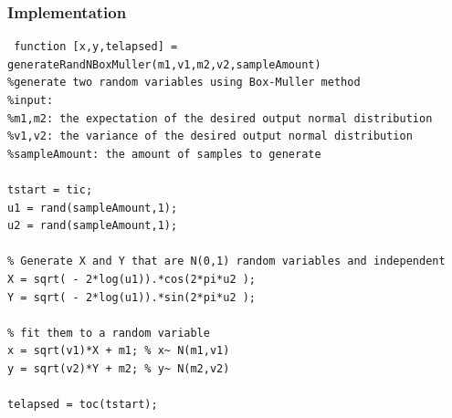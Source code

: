 \documentclass[twoside]{article}
\begin{document}
\begin{multicols*}{2}
\subsubsection{Implementation}
 \begin{lstlisting}
 function [x,y,telapsed] = generateRandNBoxMuller(m1,v1,m2,v2,sampleAmount)
%generate two random variables using Box-Muller method
%input: 
%m1,m2: the expectation of the desired output normal distribution
%v1,v2: the variance of the desired output normal distribution
%sampleAmount: the amount of samples to generate 

tstart = tic;
u1 = rand(sampleAmount,1);
u2 = rand(sampleAmount,1);

% Generate X and Y that are N(0,1) random variables and independent
X = sqrt( - 2*log(u1)).*cos(2*pi*u2 ); 
Y = sqrt( - 2*log(u1)).*sin(2*pi*u2 );

% fit them to a random variable 
x = sqrt(v1)*X + m1; % x~ N(m1,v1)
y = sqrt(v2)*Y + m2; % y~ N(m2,v2)

telapsed = toc(tstart);
\end{lstlisting}


\end{multicols*}
\end{document}
